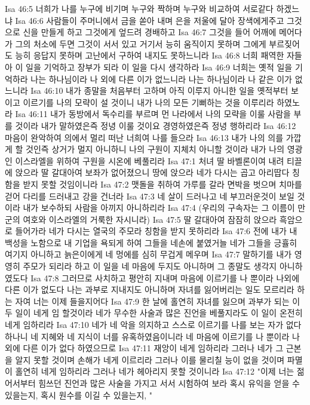 Isa 46:5  너희가 나를 누구에 비기며 누구와 짝하며 누구와 비교하여 서로같다 하겠느냐
Isa 46:6  사람들이 주머니에서 금을 쏟아 내며 은을 저울에 달아 장색에게주고 그것으로 신을 만들게 하고 그것에게 엎드려 경배하고
Isa 46:7  그것을 들어 어깨에 메어다가 그의 처소에 두면 그것이 서서 있고 거기서 능히 움직이지 못하며 그에게 부르짖어도 능히 응답지 못하며 고난에서 구하여 내지도 못하느니라
Isa 46:8  너희 패역한 자들아 이 일을 기억하고 장부가 되라 이 일을 다시 생각하라
Isa 46:9  너희는 옛적 일을 기억하라 나는 하나님이라 나 외에 다른 이가 없느니라 나는 하나님이라 나 같은 이가 없느니라
Isa 46:10  내가 종말을 처음부터 고하며 아직 이루지 아니한 일을 옛적부터 보이고 이르기를 나의 모략이 설 것이니 내가 나의 모든 기뻐하는 것을 이루리라 하였노라
Isa 46:11  내가 동방에서 독수리를 부르며 먼 나라에서 나의 모략을 이룰 사람을 부를 것이라 내가 말하였은즉 정녕 이룰 것이요 경영하였은즉 정녕 행하리라
Isa 46:12  마음이 완악하여 의에서 멀리 떠난 너희여 나를 들으라
Isa 46:13  내가 나의 의를 가깝게 할 것인즉 상거가 멀지 아니하니 나의 구원이 지체치 아니할 것이라 내가 나의 영광인 이스라엘을 위하여 구원을 시온에 베풀리라
Isa 47:1  처녀 딸 바벨론이여 내려 티끌에 앉으라 딸 갈대아여 보좌가 없어졌으니 땅에 앉으라 네가 다시는 곱고 아리땁다 칭함을 받지 못할 것임이니라
Isa 47:2  맷돌을 취하여 가루를 갈라 면박을 벗으며 치마를 걷어 다리를 드러내고 강을 건너라
Isa 47:3  네 살이 드러나고 네 부끄러운것이 보일 것이라 내가 보수하되 사람을 아끼지 아니하리라
Isa 47:4  (우리의 구속자는 그 이름이 만군의 여호와 이스라엘의 거룩한 자시니라)
Isa 47:5  딸 갈대아여 잠잠히 앉으라 흑암으로 들어가라 네가 다시는 열국의 주모라 칭함을 받지 못하리라
Isa 47:6  전에 내가 내 백성을 노함으로 내 기업을 욕되게 하여 그들을 네손에 붙였거늘 네가 그들을 긍휼히 여기지 아니하고 늙은이에게 네 멍에를 심히 무겁게 메우며
Isa 47:7  말하기를 내가 영영히 주모가 되리라 하고 이 일을 네 마음에 두지도 아니하며 그 종말도 생각지 아니하였도다
Isa 47:8  그러므로 사치하고 평안히 지내며 마음에 이르기를 나 뿐이라 나외에 다른 이가 없도다 나는 과부로 지내지도 아니하며 자녀를 잃어버리는 일도 모르리라 하는 자여 너는 이제 들을지어다
Isa 47:9  한 날에 홀연히 자녀를 잃으며 과부가 되는 이 두 일이 네게 임 할것이라 네가 무수한 사술과 많은 진언을 베풀지라도 이 일이 온전히 네게 임하리라
Isa 47:10  네가 네 악을 의지하고 스스로 이르기를 나를 보는 자가 없다 하나니 네 지혜와 네 지식이 너를 유혹하였음이니라 네 마음에 이르기를 나 뿐이라 나 외에 다른 이가 없다 하였으므로
Isa 47:11  재앙이 네게 임하리라 그러나 네가 그 근본을 알지 못할 것이며 손해가 네게 이르리라 그러나 이를 물리칠 능이 없을 것이며 파멸이 홀연히 네게 임하리라 그러나 네가 헤아리지 못할 것이니라
Isa 47:12  "이제 너는 젊어서부터 힘쓰던 진언과 많은 사술을 가지고 서서 시험하여 보라 혹시 유익을 얻을 수 있을는지, 혹시 원수를 이길 수 있을는지, "
